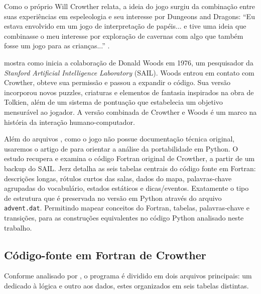 \documentclass[12pt,a4paper]{article}
\begin{document}
Como o próprio Will Crowther relata, a ideia do jogo surgiu da combinação entre suas experiências em espeleologia e seu interesse por Dungeons and Dragons: “Eu estava envolvido em um jogo de interpretação de papéis... e tive uma ideia que combinasse o meu interesse por exploração de cavernas com algo que também fosse um jogo para as crianças...” \textcite{peterson1983genesis}.

\textcite{levy2010hackers} mostra como inicia a colaboração de Donald Woods em 1976, um pesquisador da \textit{Stanford Artificial Intelligence Laboratory} (SAIL). Woods entrou em contato com Crowther, obteve sua permissão e passou a expandir o código. Sua versão incorporou novos puzzles, criaturas e elementos de fantasia inspirados na obra de Tolkien, além de um sistema de pontuação que estabelecia um objetivo mensurável ao jogador. A versão combinada de Crowther e Woods é um marco na história da interação humano-computador.

Além do arquivos \textcite{adventure_original_sources}, como o jogo não possue documentação técnica original, usaremos o artigo de \textcite{jerz2007colossal} para orientar a análise da portabilidade em Python. O estudo recupera e examina o código Fortran original de Crowther, a partir de um backup do SAIL. Jerz detalha as seis tabelas centrais do código fonte em Fortran: descrições longas, rótulos curtos das salas, dados do mapa, palavras-chave agrupadas do vocabulário, estados estáticos e dicas/eventos. Exatamente o tipo de estrutura que é preservada no versão em Python através do arquivo \texttt{advent.dat}. Permitindo mapear conceitos do Fortran, tabelas, palavras‐chave e transições, para as construções equivalentes no código Python analisado neste trabalho.

\subsection{Código-fonte em Fortran de Crowther}

Conforme analisado por \textcite{jerz2007colossal}, o programa é dividido em dois arquivos principais: um dedicado à lógica e outro aos dados, estes organizados em seis tabelas distintas.
\end{document}
